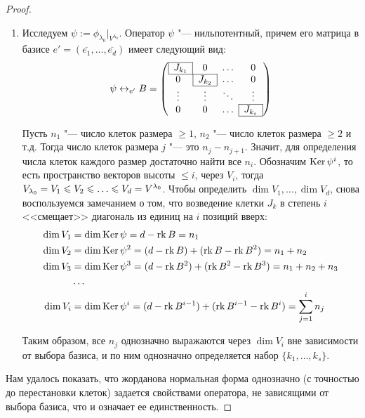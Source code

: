 \begin{proof}
\begin{enumerate}
		\item Исследуем $\psi := \phi_{\lambda_0}|_{V^{\lambda_0}}$. Оператор $\psi$ "--- нильпотентный, причем его матрица в базисе $e' = (\overline{e_1}, \dots, \overline{e_d})$ имеет следующий вид:
		\[\psi \leftrightarrow_{e'} B = \left(\begin{array}{@{}cccc@{}}
			\cline{1-1}
			\multicolumn{1}{|c|}{J_{k_1}} & 0 & \dots & 0\\
			\cline{1-2}
			0 & \multicolumn{1}{|c|}{J_{k_2}} & \dots & 0\\
			\cline{2-2}
			\vdots & \vdots & \ddots & \vdots\\
			\cline{4-4}
			0 & 0 & \dots & \multicolumn{1}{|c|}{J_{k_s}}\\
			\cline{4-4}
		\end{array}\right)\]
		
		Пусть $n_1$ "--- число клеток размера $\ge 1$, $n_2$ "--- число клеток размера $\ge 2$ и т.\:д. Тогда число клеток размера $j$ "--- это $n_j - n_{j + 1}$. Значит, для определения числа клеток каждого размер достаточно найти все $n_i$. Обозначим $\operatorname{Ker}{\psi^i}$, то есть пространство векторов высоты $\le i$, через $V_i$, тогда $V_{\lambda_0} \hm{=} V_1 \le V_2 \hm{\le} \dots \hm{\le} V_d = V^{\lambda_0}$. Чтобы определить $\dim{V_1}, \dots, \dim{V_d}$, снова воспользуемся замечанием о том, что возведение клетки $J_k$ в степень $i$ <<смещает>> диагональ из единиц на $i$ позиций вверх:
		\begin{align*}
			\dim{V_1} &= \dim{\operatorname{Ker}{\psi}} = d - \operatorname{rk}{B} = n_1\\
			\dim{V_2} &= \dim{\operatorname{Ker}{\psi^2}} = (d - \operatorname{rk}{B}) + (\operatorname{rk}{B} - \operatorname{rk}{B^2}) = n_1 + n_2\\
			\dim{V_3} &= \dim{\operatorname{Ker}{\psi^3}} = (d - \operatorname{rk}{B^2}) + (\operatorname{rk}{B^2} - \operatorname{rk}{B^3}) = n_1 + n_2 + n_3\\
			&\dots\\
			\dim{V_i} &= \dim{\operatorname{Ker}{\psi^i}} = (d - \operatorname{rk}{B^{i - 1}}) + (\operatorname{rk}{B^{i - 1}} - \operatorname{rk}{B^i})= \sum_{j = 1}^in_j
		\end{align*}
		
		Таким образом, все $n_j$ однозначно выражаются через $\dim{V_i}$ вне зависимости от выбора базиса, и по ним однозначно определяется набор $\{k_1, \dots, k_s\}$.
	\end{enumerate}
	
	Нам удалось показать, что жорданова нормальная форма однозначно (с точностью до перестановки клеток) задается свойствами оператора, не зависящими от выбора базиса, что и означает ее единственность.
\end{proof}